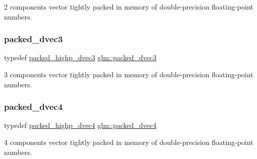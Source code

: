 2 components vector tightly packed in memory of double-\/precision floating-\/point numbers. 

\mbox{\label{group__gtc__type__aligned_ga57dabe800889e40fa81a5a7a81cc25f0}} 
\subsubsection{\texorpdfstring{packed\+\_\+dvec3}{packed\_dvec3}}
{\footnotesize\ttfamily typedef \mbox{\hyperlink{group__gtc__type__aligned_ga46950596525c0d1983113ead5f676651}{packed\+\_\+highp\+\_\+dvec3}} \mbox{\hyperlink{group__gtc__type__aligned_ga57dabe800889e40fa81a5a7a81cc25f0}{glm\+::packed\+\_\+dvec3}}}



3 components vector tightly packed in memory of double-\/precision floating-\/point numbers. 

\mbox{\label{group__gtc__type__aligned_ga858e69be626bfb48d644d8d6fe81b1a2}} 
\subsubsection{\texorpdfstring{packed\+\_\+dvec4}{packed\_dvec4}}
{\footnotesize\ttfamily typedef \mbox{\hyperlink{group__gtc__type__aligned_ga7eb6a2440202876a3a223a1931dd496a}{packed\+\_\+highp\+\_\+dvec4}} \mbox{\hyperlink{group__gtc__type__aligned_ga858e69be626bfb48d644d8d6fe81b1a2}{glm\+::packed\+\_\+dvec4}}}



4 components vector tightly packed in memory of double-\/precision floating-\/point numbers. 

\mbox{\label{group__gtc__type__aligned_ga00ef8acfca23dca78e1baa65bb5861ac}} 
